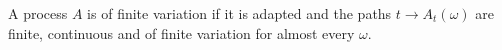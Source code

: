 

\begin{definition}
	A process $A$ is of finite variation if it is adapted and the paths $t \rightarrow A_{t}(\omega)$ are finite, continuous and of finite variation for almost every $\omega .$
\end{definition}

